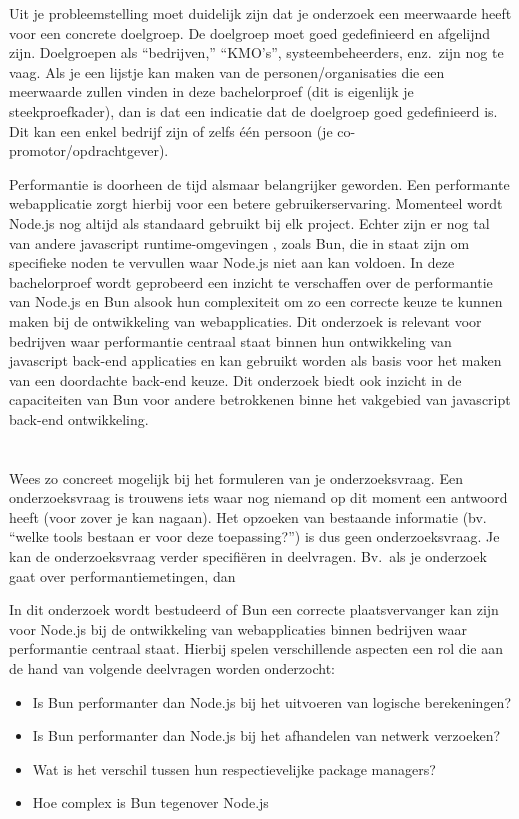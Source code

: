 Uit je probleemstelling moet duidelijk zijn dat je onderzoek een meerwaarde heeft voor een concrete doelgroep. 
De doelgroep moet goed gedefinieerd en afgelijnd zijn. Doelgroepen als ``bedrijven,'' ``KMO's'', systeembeheerders, enz.~zijn nog te vaag. 
Als je een lijstje kan maken van de personen/organisaties die een meerwaarde zullen vinden in deze bachelorproef (dit is eigenlijk je steekproefkader), 
dan is dat een indicatie dat de doelgroep goed gedefinieerd is. Dit kan een enkel bedrijf zijn of zelfs één persoon (je co-promotor/opdrachtgever).

Performantie is doorheen de tijd alsmaar belangrijker geworden. 
Een performante webapplicatie zorgt hierbij voor een betere gebruikerservaring. 
Momenteel wordt Node.js nog altijd als standaard gebruikt bij elk project. Echter zijn er nog tal van andere javascript runtime-omgevingen
, zoals Bun, die in staat zijn om specifieke noden te vervullen waar Node.js niet aan kan voldoen. In deze bachelorproef wordt geprobeerd 
een inzicht te verschaffen over de performantie van Node.js en Bun alsook hun complexiteit 
om zo een correcte keuze te kunnen maken bij de ontwikkeling van webapplicaties.
Dit onderzoek is relevant voor bedrijven waar performantie centraal staat binnen hun ontwikkeling van javascript back-end applicaties en kan gebruikt worden als basis 
voor het maken van een doordachte back-end keuze. Dit onderzoek 
biedt ook inzicht in de capaciteiten van Bun voor andere betrokkenen binne het vakgebied van javascript back-end ontwikkeling.

\section{}%
\label{sec:onderzoeksvraag}

Wees zo concreet mogelijk bij het formuleren van je onderzoeksvraag. 
Een onderzoeksvraag is trouwens iets waar nog niemand op dit moment een antwoord heeft
 (voor zover je kan nagaan). Het opzoeken van bestaande informatie (bv. ``welke tools bestaan er voor deze toepassing?'') is dus geen onderzoeksvraag. 
Je kan de onderzoeksvraag verder specifiëren in deelvragen. 
Bv.~als je onderzoek gaat over performantiemetingen, dan 

In dit onderzoek wordt bestudeerd of Bun 
een correcte plaatsvervanger kan zijn voor Node.js bij de ontwikkeling van webapplicaties binnen bedrijven 
waar performantie centraal staat.
Hierbij spelen verschillende aspecten een rol die aan de hand van volgende deelvragen worden onderzocht:
\begin{itemize}
  \item Is Bun performanter dan Node.js bij het uitvoeren van logische berekeningen?
  \item Is Bun performanter dan Node.js bij het afhandelen van netwerk verzoeken?
  \item Wat is het verschil tussen hun respectievelijke package managers?
  \item Hoe complex is Bun tegenover Node.js
\end{itemize}


